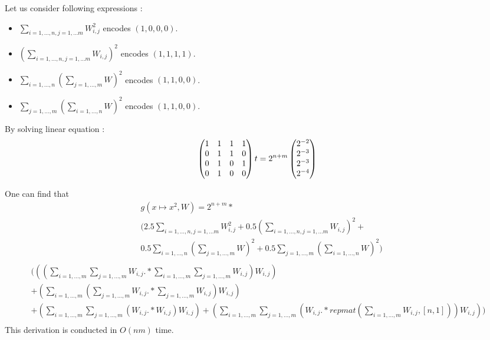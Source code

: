 \documentclass{article}
\begin{document}
Let us consider following expressions : 
\begin{itemize}
 \item $\sum_{i = 1, \dots, n, j = 1, \dots m} W_{i, j}^2$ encodes $(1, 0, 0, 0)$. 
 \item $(\sum_{i = 1, \dots, n, j = 1, \dots m} W_{i, j})^2$ encodes $(1, 1, 1, 1)$.
 \item $\sum_{i = 1, \dots, n}(\sum_{j = 1, \dots, m} W)^2$ encodes $(1, 1, 0, 0)$. 
 \item $\sum_{j = 1, \dots, m}(\sum_{i = 1, \dots, n} W)^2$ encodes $(1, 1, 0, 0)$. 
\end{itemize}
 
 By solving linear equation :
 \begin{equation}
 \begin{pmatrix} 
  1 & 1 & 1 & 1 \\ 
  0 & 1 & 1 & 0 \\ 
  0 & 1 & 0 & 1 \\ 
  0 & 1 & 0 & 0 \\     
\end{pmatrix}t = 2^{n + m}\begin{pmatrix} 
  2^{-2}\\ 
  2^{-3}\\ 
  2^{-3}\\ 
  2^{-4}\\     
\end{pmatrix} \\
 \end{equation}

One can find that 
\begin{align*}
	&g(x \mapsto x^2, W) = 2^{n + m} * \\ 
 &\Big( 2.5\sum_{i = 1, \dots, n, j = 1, \dots m} W_{i, j}^2 + 0.5(\sum_{i = 1, \dots, n, j = 1, \dots m} W_{i, j})^2 + \\
 &0.5\sum_{i = 1, \dots, n}(\sum_{j = 1, \dots, m} W)^2 + 0.5\sum_{j = 1, \dots, m}(\sum_{i = 1, \dots, n} W)^2 \Big)\\
\end{align*}
\begin{align}
(((\sum_{i = 1, \dots, m} \sum_{j = 1, \dots, m} W_{i, j}  .* \sum_{i = 1, \dots, m} \sum_{j = 1, \dots, m} W_{i, j})    W_{i, j}) \\
  + (\sum_{i = 1, \dots, m} ( \sum_{j = 1, \dots, m} W_{i, j} .* \sum_{j = 1, \dots, m} W_{i, j})    W_{i, j}) \\
  + ( \sum_{i = 1, \dots, m} \sum_{j = 1, \dots, m} ( W_{i, j} .* W_{i, j})   W_{i, j})  + (\sum_{i = 1, \dots, m} \sum_{j = 1, \dots, m} ( W_{i, j} .* repmat(\sum_{i = 1, \dots, m} W_{i, j}, [n, 1]))    W_{i, j}))\\
\end{align}
This derivation is conducted in $O(nm)$ time.
\end{document}

